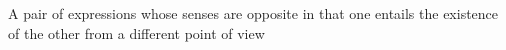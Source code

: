 A pair of expressions whose senses are opposite in that one entails the existence of the other from a different point of view
